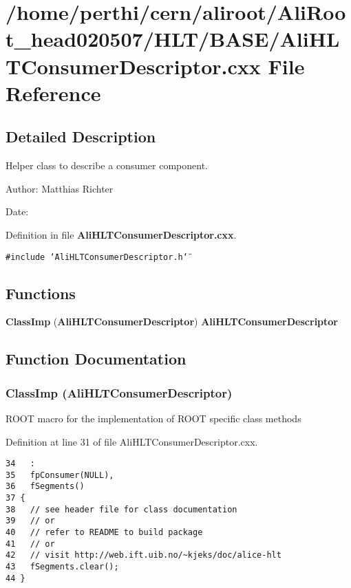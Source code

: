\section{/home/perthi/cern/aliroot/Ali\-Root\_\-head020507/HLT/BASE/Ali\-HLTConsumer\-Descriptor.cxx File Reference}
\label{AliHLTConsumerDescriptor_8cxx}


\subsection{Detailed Description}
Helper class to describe a consumer component. 

\begin{Desc}
\item[Author:]Matthias Richter \end{Desc}
\begin{Desc}
\item[Date:]\end{Desc}


Definition in file {\bf Ali\-HLTConsumer\-Descriptor.cxx}.

{\tt \#include \char`\"{}Ali\-HLTConsumer\-Descriptor.h\char`\"{}}\par
\subsection*{Functions}
\begin{CompactItemize}
\item 
{\bf Class\-Imp} ({\bf Ali\-HLTConsumer\-Descriptor}) {\bf Ali\-HLTConsumer\-Descriptor}
\end{CompactItemize}


\subsection{Function Documentation}
\subsubsection{\setlength{\rightskip}{0pt plus 5cm}Class\-Imp ({\bf Ali\-HLTConsumer\-Descriptor})}\label{AliHLTConsumerDescriptor_8cxx_a0}


ROOT macro for the implementation of ROOT specific class methods 

Definition at line 31 of file Ali\-HLTConsumer\-Descriptor.cxx.

\footnotesize\begin{verbatim}34   :
35   fpConsumer(NULL),
36   fSegments()
37 {
38   // see header file for class documentation
39   // or
40   // refer to README to build package
41   // or
42   // visit http://web.ift.uib.no/~kjeks/doc/alice-hlt
43   fSegments.clear();
44 }

\end{verbatim}\normalsize 


